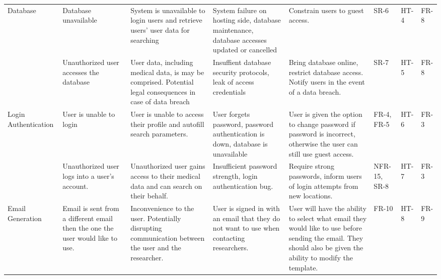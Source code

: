 \documentclass{article}
\begin{document}
\begin{table}[H]
{\begin{tabular}{|p{3cm}|p{3cm}p{3cm}p{3cm}p{3cm}p{3cm}p{2cm}p{2cm}|}
      \hline
      Database                                 & Database unavailable                                                          & System is unavailable to login users and retrieve users' user data for searching                                      & System failure on hosting side, database maintenance, database accesses updated or cancelled     & Constrain users to guest access.                                                                                                                               & SR-6              & HT-4   & FR-8  \\\cline{2-8}
                                               & Unauthorized user accesses the database                                       & User data, including medical data, is may be comprised. Potential legal consequences in case of data breach           & Insuffient database security protocols, leak of access credentials                               & Bring database online, restrict database access. Notify users in the event of a data breach.                                                                   & SR-7              & HT-5   & FR-8  \\
      \hline
      Login Authentication                     & User is unable to login                                                       & User is unable to access their profile and autofill search parameters.                                                & User forgets password, password authentication is down, database is unavailable                  & User is given the option to change password if password is incorrect, otherwise the user can still use guest access.                                           & FR-4, FR-5        & HT-6   & FR-3  \\\cline{2-8}
                                               & Unauthorized user logs into a user's account.                                 & Unauthorized user gains access to their medical data and can search on their behalf.                                  & Insufficient password strength, login authentication bug.                                        & Require strong passwords, inform users of login attempts from new locations.                                                                                   & NFR-15, SR-8      & HT-7   & FR-3  \\
      \hline
      Email Generation                         & Email is sent from a different email then the one the user would like to use. & Inconvenience to the user. Potentially disrupting communication between the user and the researcher.                  & User is signed in with an email that they do not want to use when contacting researchers.        & User will have the ability to select what email they would like to use before sending the email. They should also be given the ability to modify the template. & FR-10             & HT-8   & FR-9  \\\cline{2-8}

\end{tabular}}
\end{table}
\end{document}
